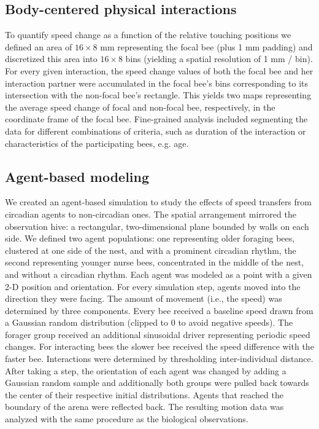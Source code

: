 \documentclass{article}
\newcommand{\deleted}[1]{{\color{red}#1}} %
\newcommand{\deleted}[1]{}
\begin{document}
\subsection*{Body-centered physical interactions}
To quantify speed change as a function of the relative touching positions we defined an area of $16 \times 8$ mm representing the focal bee (plus 1 mm padding) and discretized this area into $16 \times 8$ bins (yielding a spatial resolution of 1 mm / bin). For every given interaction, the speed change values of both the focal bee and her interaction partner were accumulated in the focal bee’s bins corresponding to its intersection with the non-focal bee’s rectangle. This yields two maps representing the average speed change of focal and non-focal bee, respectively, in the coordinate frame of the focal bee.   Fine-grained analysis included segmenting the data for different combinations of criteria, such as duration of the interaction or characteristics of the participating bees, e.g. age.

\subsection*{Agent-based modeling}
\deleted{We created an agent-based simulation to study the effects of speed transfers from circadian agents to non-circadian ones. The spatial arrangement mirrored the observation hive: a rectangular, two-dimensional plane bounded by walls on each side. We defined two agent populations: one representing older foraging bees, clustered at one side of the nest, and with a prominent circadian rhythm, the second representing younger nurse bees, concentrated in the middle of the nest, and without a circadian rhythm. Each agent was modeled as a point with a given 2-D position and orientation. For every simulation step, agents moved into the direction they were facing. The amount of movement (i.e., the speed) was determined by three components. Every bee received a baseline speed drawn from a Gaussian random distribution (clipped to 0 to avoid negative speeds). The forager group received an additional sinusoidal driver representing periodic speed changes. For interacting bees the slower bee received the speed difference with the faster bee. Interactions were determined by thresholding inter-individual distance. After taking a step, the orientation of each agent was changed by adding a Gaussian random sample and additionally both groups were pulled back towards the center of their respective initial distributions. Agents that reached the boundary of the arena were reflected back. The resulting motion data was analyzed with the same procedure as the biological observations.}
\end{document}
